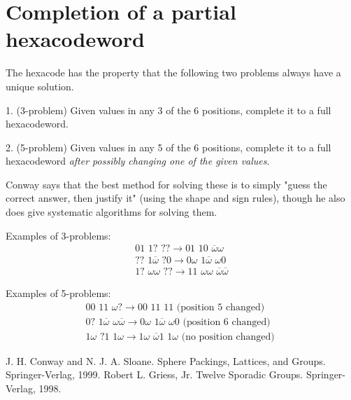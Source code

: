 \documentclass[12pt]{article}
\newcommand{\w}{\omega}
\newcommand{\W}{\overline{\omega}}
\newcommand{\cw}[6]{#1#2\,\,#3#4\,\,#5#6}
\begin{document}
\section{Completion of a partial hexacodeword}

The hexacode has the property that the following two problems always have a unique solution.

1. (3-problem) Given values in any 3 of the 6 positions, complete it to a full hexacodeword.

2. (5-problem) Given values in any 5 of the 6 positions, complete it to a full hexacodeword \emph{after possibly changing one of the given values}.

Conway says that the best method for solving these is to simply "guess the correct answer, then justify it" (using the shape and sign rules), though he also does give systematic algorithms for solving them.

Examples of 3-problems:
$$\begin{array}{c}
\cw{0}{1}{1}{?}{?}{?} \rightarrow \cw{0}{1}{1}{0}{\W}{\w}\\
\cw{?}{?}{1}{\W}{?}{0} \rightarrow \cw{0}{\w}{1}{\W}{\w}{0}\\
\cw{1}{?}{\w}{\w}{?}{?} \rightarrow \cw{1}{1}{\w}{\w}{\W}{\W}
\end{array}$$

Examples of 5-problems:
$$\begin{array}{c}
\cw{0}{0}{1}{1}{\w}{?} \rightarrow \cw{0}{0}{1}{1}{1}{1} \mbox{ (position 5 changed)}\\
\cw{0}{?}{1}{\W}{\w}{\W} \rightarrow \cw{0}{\w}{1}{\W}{\w}{0} \mbox{ (position 6 changed) }\\
\cw{1}{\w}{?}{1}{1}{\w} \rightarrow \cw{1}{\w}{\W}{1}{1}{\w} \mbox{ (no position changed) }
\end{array}$$

\begin{thebibliography}{9}
 J. H. Conway and N. J. A. Sloane. Sphere Packings, Lattices, and Groups.  Springer-Verlag, 1999.
 Robert L. Griess, Jr.  Twelve Sporadic Groups.  Springer-Verlag, 1998.
\end{thebibliography}
\end{document}
